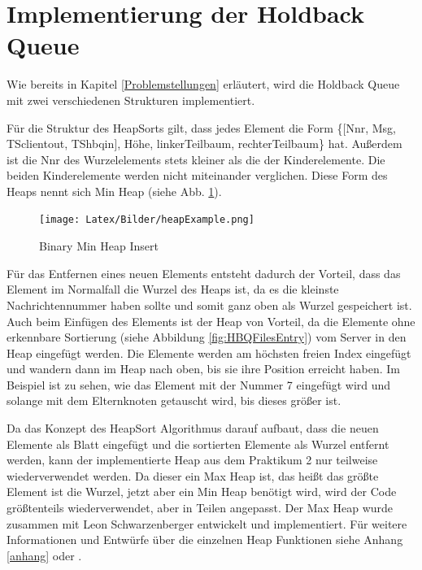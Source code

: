 \section{Implementierung der Holdback Queue}

Wie bereits in Kapitel \ref{Problemstellungen} erläutert, wird die Holdback Queue mit zwei verschiedenen Strukturen implementiert.

Für die Struktur des HeapSorts gilt, dass jedes Element die Form \{$[$Nnr, Msg, TSclientout, TShbqin$]$, Höhe, linkerTeilbaum, rechterTeilbaum\} hat. Außerdem ist die Nnr des Wurzelelements stets kleiner als die der Kinderelemente. Die beiden Kinderelemente werden nicht miteinander verglichen. Diese Form des Heaps nennt sich Min Heap (siehe Abb. \ref{fig:binHeap}).

\begin{figure}[htbp]
\begin{center}
\texttt{[image: Latex/Bilder/heapExample.png]}
\caption[Binary Min Heap Insert]{Binary Min Heap Insert\footnotemark}\label{fig:binHeap} 
\end{center}
\end{figure}

Für das Entfernen eines neuen Elements entsteht dadurch der Vorteil, dass das Element im Normalfall die Wurzel des Heaps ist, da es die kleinste Nachrichtennummer haben sollte und somit ganz oben als Wurzel gespeichert ist. Auch beim Einfügen des Elements ist der Heap von Vorteil, da die Elemente ohne erkennbare Sortierung (siehe Abbildung \ref{fig:HBQFilesEntry}) vom Server in den Heap eingefügt werden. Die Elemente werden am höchsten freien Index eingefügt und wandern dann im Heap nach oben, bis sie ihre Position erreicht haben. Im Beispiel ist zu sehen, wie das Element mit der Nummer 7 eingefügt wird und solange mit dem Elternknoten getauscht wird, bis dieses größer ist. 

Da das Konzept des HeapSort Algorithmus darauf aufbaut, dass die neuen Elemente als Blatt eingefügt und die sortierten Elemente als Wurzel entfernt werden, kann der implementierte Heap aus dem Praktikum 2 nur teilweise wiederverwendet werden. Da dieser ein Max Heap ist, das heißt das größte Element ist die Wurzel, jetzt aber ein Min Heap benötigt wird, wird der Code größtenteils wiederverwendet, aber in Teilen angepasst.
Der Max Heap wurde zusammen mit Leon Schwarzenberger entwickelt und implementiert. Für weitere Informationen und Entwürfe über die einzelnen Heap Funktionen siehe Anhang \ref{anhang} oder \cite{sortAlgo}.

